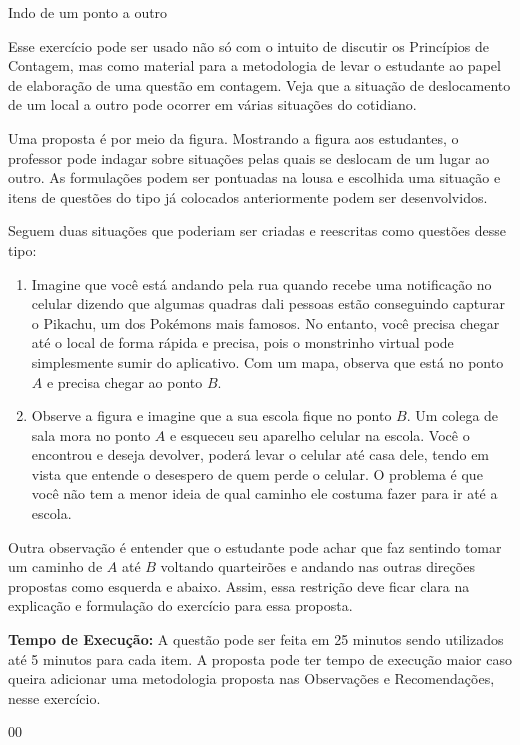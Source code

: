 \begin{sugestions}{Indo de um ponto a outro}
{
Esse exercício pode ser usado não só com o intuito de discutir os Princípios de Contagem, mas como material para a metodologia de levar o estudante ao papel de elaboração de uma questão em contagem. Veja que a situação de deslocamento de um local a outro pode ocorrer em várias situações do cotidiano.

Uma  proposta é por meio da figura. Mostrando a figura aos estudantes, o professor pode indagar sobre situações pelas quais se deslocam de um lugar ao outro. As formulações podem ser pontuadas na lousa e escolhida uma situação e itens de questões do tipo já colocados anteriormente podem ser desenvolvidos.

Seguem duas situações que poderiam ser criadas e reescritas como questões desse tipo: 

\begin{enumerate}[topsep=0pt]
\item Imagine que você está andando pela rua quando recebe uma notificação no celular dizendo que algumas quadras dali pessoas estão conseguindo capturar o Pikachu, um dos Pokémons mais famosos. No entanto, você precisa chegar até o local de forma rápida e precisa, pois o monstrinho virtual pode simplesmente sumir do aplicativo. Com um mapa, observa que está no ponto $A$ e precisa chegar ao ponto $B.$

\item Observe a figura e imagine que a sua escola fique no ponto $B$. Um colega de sala mora no ponto $A$ e esqueceu seu aparelho celular na escola. Você o encontrou e deseja devolver, poderá levar o celular até casa dele, tendo em vista que entende o desespero de quem perde o celular. O problema é que você não tem a menor ideia de qual caminho ele costuma fazer para ir até a escola.
\end{enumerate}

Outra observação é entender que o estudante pode achar que faz sentindo tomar um caminho de $A$ até $B$ voltando quarteirões e andando nas outras direções propostas como esquerda e abaixo. Assim, essa restrição deve ficar clara na explicação e formulação do exercício para essa proposta.

\textbf{Tempo de Execução:} A questão pode ser feita em 25 minutos sendo utilizados até 5  minutos para cada item. A proposta pode ter tempo de execução maior caso queira adicionar uma metodologia proposta nas Observações e Recomendações, nesse exercício.
}{0}{0}
\end{sugestions}

